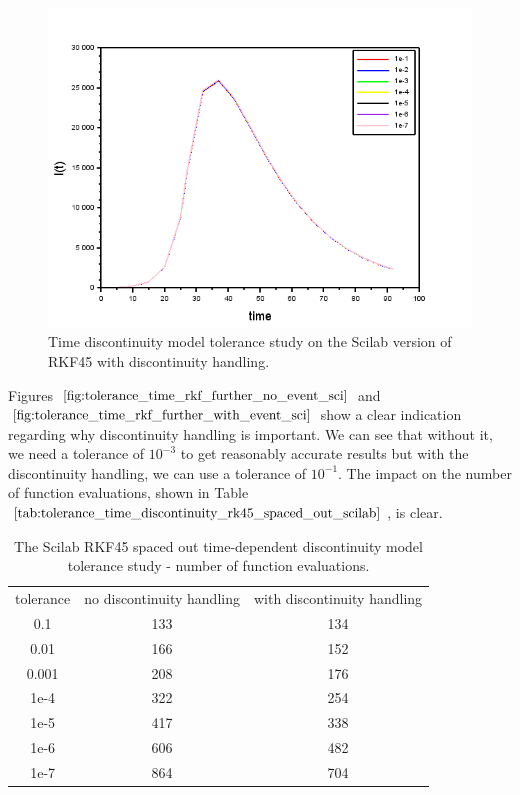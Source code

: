 \begin{figure}[H]
\centering
\includegraphics[width=0.7\linewidth]{./figures/tolerance_time_rkf_further_with_event_sci}
\caption{Time discontinuity model tolerance study on the Scilab version of RKF45 with discontinuity handling.}
\label{fig:tolerance_time_rkf_further_with_event_sci}
\end{figure}

Figures $\ref{fig:tolerance_time_rkf_further_no_event_sci}$ and $\ref{fig:tolerance_time_rkf_further_with_event_sci}$ show a clear indication regarding why discontinuity handling is important. We can see that without it, we need a tolerance of $10^{-3}$ to get reasonably accurate results but with the discontinuity handling, we can use a tolerance of $10^{-1}$. The impact on the number of function evaluations, shown in Table $\ref{tab:tolerance_time_discontinuity_rk45_spaced_out_scilab}$, is clear.

\begin{table}[H]
\caption {The Scilab RKF45 spaced out time-dependent discontinuity model tolerance study - number of function evaluations.} 
\label{tab:tolerance_time_discontinuity_rk45_spaced_out_scilab} 
\begin{center}
\begin{tabular}{ c c c }
tolerance & no discontinuity handling & with discontinuity handling\\ 
0.1 & 133 & 134 \\
0.01 & 166 & 152 \\
0.001 & 208 & 176 \\
1e-4 & 322 & 254 \\
1e-5 & 417 & 338 \\
1e-6 & 606 & 482 \\
1e-7 & 864 & 704 \\
\end{tabular}
\end{center}
\end{table}


